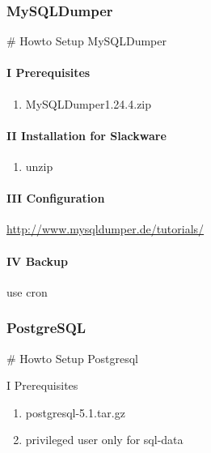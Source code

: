 \documentclass[letterpaper,10pt,english]{sphinxmanual}
\begin{document}
\subsubsection{MySQLDumper}
\label{sdocs/databases/mysqldumper/mysqldumper:mysqldumper}\label{sdocs/databases/mysqldumper/mysqldumper::doc}
\# Howto Setup MySQLDumper


\paragraph{I Prerequisites}
\label{sdocs/databases/mysqldumper/mysqldumper:i-prerequisites}\begin{enumerate}
\item {} 
MySQLDumper1.24.4.zip

\end{enumerate}


\paragraph{II Installation for Slackware}
\label{sdocs/databases/mysqldumper/mysqldumper:ii-installation-for-slackware}\begin{enumerate}
\item {} 
unzip

\end{enumerate}


\paragraph{III Configuration}
\label{sdocs/databases/mysqldumper/mysqldumper:iii-configuration}
\href{http://www.mysqldumper.de/tutorials/}{http://www.mysqldumper.de/tutorials/}


\paragraph{IV Backup}
\label{sdocs/databases/mysqldumper/mysqldumper:iv-backup}
use cron


\subsubsection{PostgreSQL}
\label{sdocs/databases/postgresql/postgresql:postgresql}\label{sdocs/databases/postgresql/postgresql::doc}
\# Howto Setup Postgresql

I Prerequisites
\begin{enumerate}
\item {} 
postgresql-5.1.tar.gz

\item {} 
privileged user only for sql-data

\end{enumerate}
\end{document}
